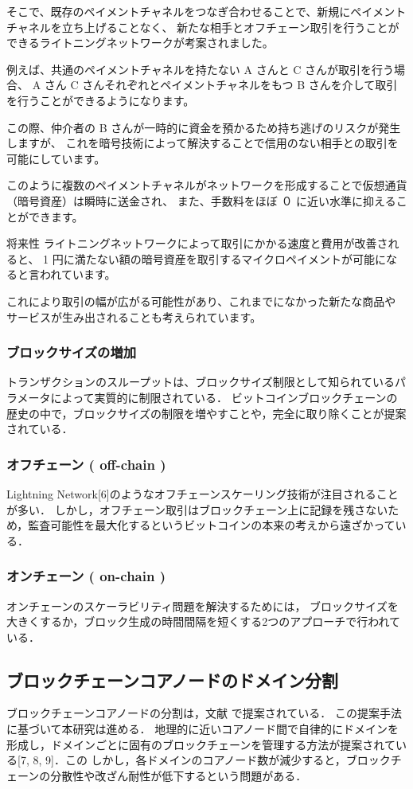 \documentclass[a4paper,12pt]{jsarticle}
\begin{document}
そこで、既存のペイメントチャネルをつなぎ合わせることで、新規にペイメントチャネルを立ち上げることなく、
新たな相手とオフチェーン取引を行うことができるライトニングネットワークが考案されました。

例えば、共通のペイメントチャネルを持たない A さんと C さんが取引を行う場合、 
A さん C さんそれぞれとペイメントチャネルをもつ B さんを介して取引を行うことができるようになります。

この際、仲介者の B さんが一時的に資金を預かるため持ち逃げのリスクが発生しますが、
これを暗号技術によって解決することで信用のない相手との取引を可能にしています。

このように複数のペイメントチャネルがネットワークを形成することで仮想通貨（暗号資産）は瞬時に送金され、
また、手数料をほぼ ０ に近い水準に抑えることができます。

将来性
ライトニングネットワークによって取引にかかる速度と費用が改善されると、 
1 円に満たない額の暗号資産を取引するマイクロペイメントが可能になると言われています。

これにより取引の幅が広がる可能性があり、これまでになかった新たな商品や
サービスが生み出されることも考えられています。

\subsubsection{ブロックサイズの増加}%
トランザクションのスループットは、ブロックサイズ制限として知られているパラメータによって実質的に制限されている．
ビットコインブロックチェーンの歴史の中で，ブロックサイズの制限を増やすことや，完全に取り除くことが提案されている．

\subsubsection{オフチェーン ( off-chain )}
Lightning Network[6]のようなオフチェーンスケーリング技術が注目されることが多い．
しかし，オフチェーン取引はブロックチェーン上に記録を残さないため，監査可能性を最大化するというビットコインの本来の考えから遠ざかっている．

\subsubsection{オンチェーン ( on-chain )}
オンチェーンのスケーラビリティ問題を解決するためには，
ブロックサイズを大きくするか，ブロック生成の時間間隔を短くする2つのアプローチで行われている．

\subsection{ブロックチェーンコアノードのドメイン分割}
ブロックチェーンコアノードの分割は，文献 \cite{fujihara1}\cite{fujihara2}で提案されている．
この提案手法に基づいて本研究は進める．
地理的に近いコアノード間で自律的にドメインを形成し，ドメインごとに固有のブロックチェーンを管理する方法が提案されている[7, 8, 9]．この
しかし，各ドメインのコアノード数が減少すると，ブロックチェーンの分散性や改ざん耐性が低下するという問題がある．
\end{document}
